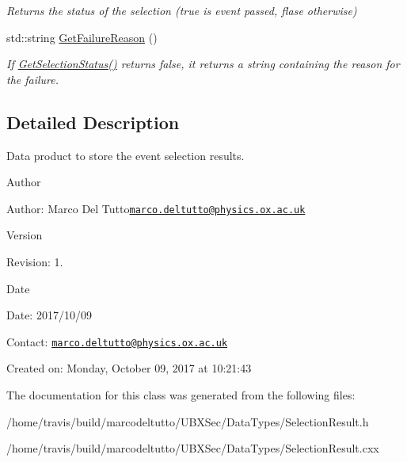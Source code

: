 \begin{DoxyCompactItemize}
\begin{DoxyCompactList}\small\item\em Returns the status of the selection (true is event passed, flase otherwise) \end{DoxyCompactList}\item 
\hypertarget{classubana_1_1SelectionResult_a8b944eb143cb58faad70480c0600bb36}{std\-::string \hyperlink{classubana_1_1SelectionResult_a8b944eb143cb58faad70480c0600bb36}{Get\-Failure\-Reason} ()}\label{classubana_1_1SelectionResult_a8b944eb143cb58faad70480c0600bb36}

\begin{DoxyCompactList}\small\item\em If \hyperlink{classubana_1_1SelectionResult_a2a45390dcb4c138003158a76ac94a8a8}{Get\-Selection\-Status()} returns false, it returns a string containing the reason for the failure. \end{DoxyCompactList}\end{DoxyCompactItemize}


\subsection{Detailed Description}
Data product to store the event selection results. 

\begin{DoxyAuthor}{Author}

\end{DoxyAuthor}
\begin{DoxyParagraph}{Author\-:}
Marco Del Tutto\href{mailto:marco.deltutto@physics.ox.ac.uk}{\tt marco.\-deltutto@physics.\-ox.\-ac.\-uk} 
\end{DoxyParagraph}


\begin{DoxyVersion}{Version}

\end{DoxyVersion}
\begin{DoxyParagraph}{Revision\-:}
1. 
\end{DoxyParagraph}


\begin{DoxyDate}{Date}

\end{DoxyDate}
\begin{DoxyParagraph}{Date\-:}
2017/10/09 
\end{DoxyParagraph}


Contact\-: \href{mailto:marco.deltutto@physics.ox.ac.uk}{\tt marco.\-deltutto@physics.\-ox.\-ac.\-uk}

Created on\-: Monday, October 09, 2017 at 10\-:21\-:43 

The documentation for this class was generated from the following files\-:\begin{DoxyCompactItemize}
\item 
/home/travis/build/marcodeltutto/\-U\-B\-X\-Sec/\-Data\-Types/Selection\-Result.\-h\item 
/home/travis/build/marcodeltutto/\-U\-B\-X\-Sec/\-Data\-Types/Selection\-Result.\-cxx\end{DoxyCompactItemize}
